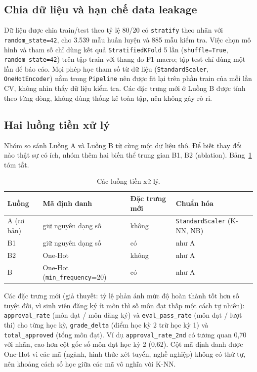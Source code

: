 \documentclass[12pt,a4paper]{article}
\begin{document}
\subsection{Chia dữ liệu và hạn chế data leakage}
Dữ liệu được chia train/test theo tỷ lệ 80/20 có \texttt{stratify} theo nhãn với \texttt{random\_state=42}, cho 3.539 mẫu huấn luyện và
885 mẫu kiểm tra. Việc chọn mô hình và tham số chỉ dùng kết quả \texttt{StratifiedKFold} 5 lần (\texttt{shuffle=True},
\texttt{random\_state=42}) trên tập train với thang đo F1-macro; tập test chỉ dùng một lần để báo cáo. Mọi phép học tham số từ dữ liệu
(\texttt{StandardScaler}, \texttt{OneHotEncoder}) nằm trong \texttt{Pipeline} nên được fit lại trên phần train của mỗi lần CV, không
nhìn thấy dữ liệu kiểm tra. Các đặc trưng mới ở Luồng B được tính theo từng dòng, không dùng thống kê toàn tập, nên không gây rò rỉ.

\subsection{Hai luồng tiền xử lý}
Nhóm so sánh Luồng A và Luồng B từ cùng một dữ liệu thô. Để biết thay đổi nào thật sự có ích, nhóm thêm hai biến thể trung gian B1, B2
(ablation). Bảng~\ref{tab:flows} tóm tắt.
\begin{table}[H]\centering\small
\begin{tabular}{@{}lp{3.2cm}p{3.6cm}p{4.2cm}@{}}\toprule
Luồng & Mã định danh & Đặc trưng mới & Chuẩn hóa\\\midrule
A (cơ bản) & giữ nguyên dạng số & không & \texttt{StandardScaler} (K-NN, NB)\\
B1 & giữ nguyên dạng số & có & như A\\
B2 & One-Hot & không & như A\\
B & One-Hot (\texttt{min\_frequency}=20) & có & như A\\\bottomrule
\end{tabular}\caption{Các luồng tiền xử lý.}\label{tab:flows}\end{table}
Các đặc trưng mới (giả thuyết: tỷ lệ phản ánh mức độ hoàn thành tốt hơn số tuyệt đối, vì sinh viên đăng ký ít môn thì số môn đạt thấp một
cách tự nhiên): \texttt{approval\_rate} (môn đạt / môn đăng ký) và \texttt{eval\_pass\_rate} (môn đạt / lượt thi) cho từng học kỳ,
\texttt{grade\_delta} (điểm học kỳ 2 trừ học kỳ 1) và \texttt{total\_approved} (tổng môn đạt). Ví dụ \texttt{approval\_rate\_2nd}
có tương quan 0,70 với nhãn, cao hơn cột gốc số môn đạt học kỳ 2 (0,62). Cột mã định danh được One-Hot vì các mã
(ngành, hình thức xét tuyển, nghề nghiệp) không có thứ tự, nên khoảng cách số học giữa các mã vô nghĩa với K-NN.
\end{document}
